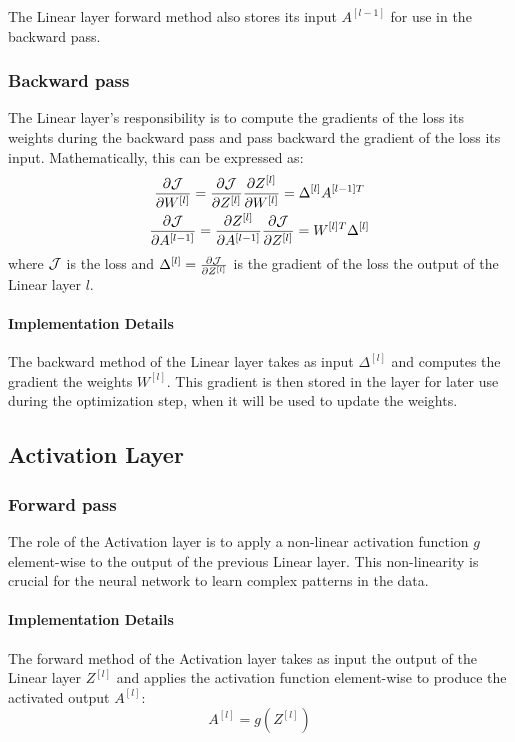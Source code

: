 The Linear layer forward method also stores its input $A^{[l - 1]}$ for use in the backward pass.

\subsubsection{Backward pass}
The Linear layer's responsibility is to compute the gradients of the loss \wrt its weights during the backward pass and pass backward the gradient of the loss \wrt its input. Mathematically, this can be expressed as:
\begin{gather}
    \pdv{\mathcal{J}}{W^{[l]}} = \pdv{\mathcal{J}}{Z^{[l]}} \pdv{Z^{[l]}}{W^{[l]}} = \Delta^{[l]} A^{[l - 1]T}\\
    \pdv{\mathcal{J}}{A^{[l - 1]}} = \pdv{Z^{[l]}}{A^{[l - 1]}} \pdv{\mathcal{J}}{Z^{[l]}} = W^{[l]T} \Delta^{[l]}
\end{gather}
where $\mathcal{J}$ is the loss and $\Delta^{[l]} = \pdv{\mathcal{J}}{Z^{[l]}}$ is the gradient of the loss \wrt the output of the Linear layer $l$.

\paragraph{Implementation Details} The backward method of the Linear layer takes as input $\Delta^{[l]}$ and computes the gradient \wrt the weights $W^{[l]}$. This gradient is then stored in the layer for later use during the optimization step, when it will be used to update the weights.

\subsection{Activation Layer}
\subsubsection{Forward pass}
The role of the Activation layer is to apply a non-linear activation function $g$ element-wise to the output of the previous Linear layer. This non-linearity is crucial for the neural network to learn complex patterns in the data.

\paragraph{Implementation Details} The forward method of the Activation layer takes as input the output of the Linear layer $Z^{[l]}$ and applies the activation function element-wise to produce the activated output $A^{[l]}$:
\begin{equation}
    A^{[l]} = g(Z^{[l]})
\end{equation}

